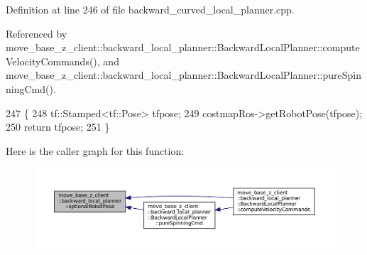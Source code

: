 Definition at line 246 of file backward\+\_\+curved\+\_\+local\+\_\+planner.\+cpp.



Referenced by move\+\_\+base\+\_\+z\+\_\+client\+::backward\+\_\+local\+\_\+planner\+::\+Backward\+Local\+Planner\+::compute\+Velocity\+Commands(), and move\+\_\+base\+\_\+z\+\_\+client\+::backward\+\_\+local\+\_\+planner\+::\+Backward\+Local\+Planner\+::pure\+Spinning\+Cmd().


\begin{DoxyCode}
247 \{
248     tf::Stamped<tf::Pose> tfpose;
249     costmapRos->getRobotPose(tfpose);
250     \textcolor{keywordflow}{return} tfpose;
251 \}
\end{DoxyCode}
Here is the caller graph for this function\+:
\nopagebreak
\begin{figure}[H]
\begin{center}
\leavevmode
\includegraphics[width=350pt]{namespacemove__base__z__client_1_1backward__local__planner_a80dbd10807e5f70adfcd0ff4dcb7c1db_icgraph}
\end{center}
\end{figure}
